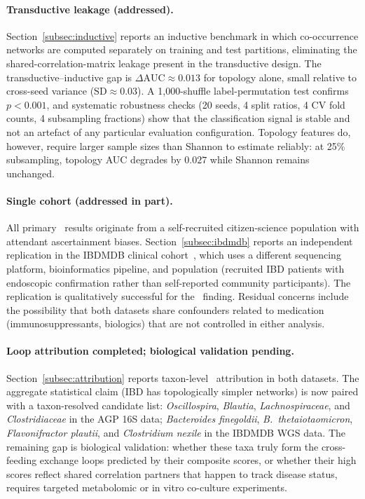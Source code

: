 \paragraph{Transductive leakage (addressed).}
Section~\ref{subsec:inductive} reports an inductive benchmark in which
co-occurrence networks are computed separately on training and test
partitions, eliminating the shared-correlation-matrix leakage present in
the transductive design.
The transductive--inductive gap is $\Delta\text{AUC} \approx 0.013$ for
topology alone, small relative to cross-seed variance ($\text{SD} \approx 0.03$).
A 1{,}000-shuffle label-permutation test confirms $p < 0.001$, and
systematic robustness checks (20 seeds, 4 split ratios, 4 CV fold counts,
4 subsampling fractions) show that the classification signal is stable and
not an artefact of any particular evaluation configuration.
Topology features do, however, require larger sample sizes than Shannon to
estimate reliably: at 25\% subsampling, topology AUC degrades by $0.027$
while Shannon remains unchanged.

\paragraph{Single cohort (addressed in part).}
All primary \agp\ results originate from a self-recruited citizen-science
population with attendant ascertainment biases.
Section~\ref{subsec:ibdmdb} reports an independent replication in the
IBDMDB clinical cohort~\citep{lloydprice2019multi}, which uses a different
sequencing platform, bioinformatics pipeline, and population (recruited IBD
patients with endoscopic confirmation rather than self-reported community
participants).
The replication is qualitatively successful for the \ibd\ finding.
Residual concerns include the possibility that both datasets share
confounders related to medication (immunosuppressants, biologics) that
are not controlled in either analysis.

\paragraph{Loop attribution completed; biological validation pending.}
Section~\ref{subsec:attribution} reports taxon-level \loo\ attribution in
both datasets.
The aggregate statistical claim (IBD has topologically simpler networks) is
now paired with a taxon-resolved candidate list: \textit{Oscillospira},
\textit{Blautia}, \textit{Lachnospiraceae}, and \textit{Clostridiaceae} in
the AGP 16S data; \textit{Bacteroides finegoldii}, \textit{B.\ thetaiotaomicron},
\textit{Flavonifractor plautii}, and \textit{Clostridium nexile} in the
IBDMDB WGS data.
The remaining gap is biological validation: whether these taxa truly form
the cross-feeding exchange loops predicted by their composite scores, or
whether their high scores reflect shared correlation partners that happen to
track disease status, requires targeted metabolomic or in vitro co-culture
experiments.


